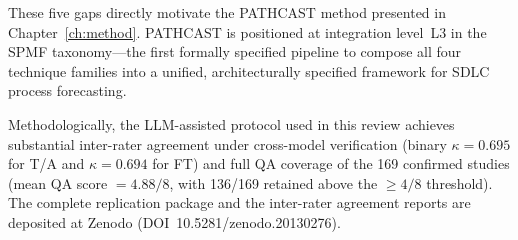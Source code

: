 These five gaps directly motivate the PATHCAST method presented in
Chapter~\ref{ch:method}. PATHCAST is positioned at integration level~L3 in
the SPMF taxonomy---the first formally specified pipeline to compose all four
technique families into a unified, architecturally specified framework for
SDLC process forecasting.

Methodologically, the LLM-assisted protocol used in this review achieves
substantial inter-rater agreement under cross-model verification (binary
$\kappa = 0.695$ for T/A and $\kappa = 0.694$ for FT) and full QA coverage of
the 169 confirmed studies (mean QA score $= 4.88/8$, with 136/169 retained
above the $\geq 4/8$ threshold). The complete replication package and the
inter-rater agreement reports are deposited at Zenodo
(DOI~10.5281/zenodo.20130276).
